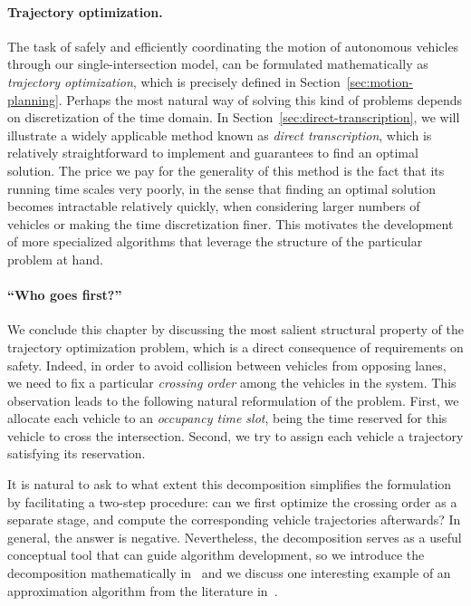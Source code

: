 \documentclass{report}
\theoremstyle{definition}
\theoremstyle{plain}
\begin{document}
\paragraph{Trajectory optimization.}
The task of safely and efficiently coordinating the motion of autonomous
vehicles through our single-intersection model, can be formulated mathematically
as \emph{trajectory optimization}, which is precisely defined in
Section~\ref{sec:motion-planning}.
Perhaps the most natural way of solving this kind of problems depends on
discretization of the time domain.
%
In Section~\ref{sec:direct-transcription}, we will illustrate a widely
applicable method known as \emph{direct
  transcription},
which is relatively straightforward to implement and guarantees to find an
optimal solution.
%
The price we pay for the generality of this method is the fact that its running
time scales very poorly, in the sense that finding an optimal solution becomes
intractable relatively quickly, when considering larger numbers of vehicles or
making the time discretization finer.
%
This motivates the development of more specialized algorithms that leverage
the structure of the particular problem at hand.

\paragraph{``Who goes first?''}
We conclude this chapter by discussing the most salient structural property of
the trajectory optimization problem, which is a direct consequence of
requirements on safety.
%
Indeed, in order to avoid collision between vehicles from opposing lanes, we
need to fix a particular \emph{crossing order} among the vehicles in the system.
%
This observation leads to the following natural reformulation of the problem.
First, we allocate each vehicle to an \emph{occupancy time slot}, being the time
reserved for this vehicle to cross the intersection. Second, we try to assign
each vehicle a trajectory satisfying its reservation.

It is natural to ask to what extent this decomposition simplifies the
formulation by facilitating a two-step procedure: can we first optimize the
crossing order as a separate stage, and compute the corresponding vehicle
trajectories afterwards?
%
In general, the answer is negative. Nevertheless, the decomposition serves as a
useful conceptual tool that can guide algorithm development, so we introduce the
decomposition mathematically in~ and we discuss one
interesting example of an approximation algorithm from the literature
in~.
\end{document}
